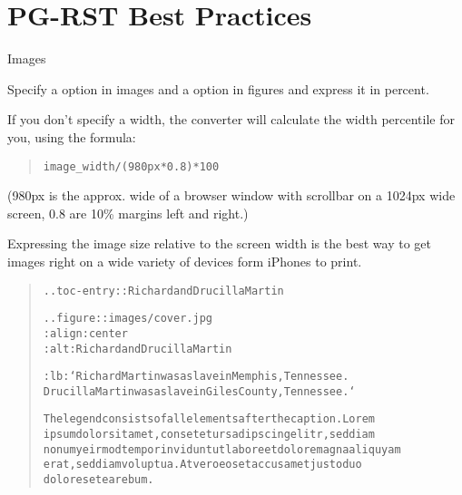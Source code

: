 \documentclass[a5paper]{book}
\begin{document}
\begin{german}
\cleardoublepage
\label{pg-rst-best-practices}%
\hypertarget{pg-rst-best-practices}{}%
%
\chapter*{PG-RST Best Practices}


\vspace{1em}
\begin{center}
Images
\end{center}

\vspace{2em}
Specify a {} option in images and a {}
option in figures and express it in percent.\par

If you don’t specify a width, the converter will calculate the width
percentile for you, using the formula:\par

\begin{quote}
\begin{alltt}
image\_width / (980px * 0.8) * 100
\end{alltt}
\end{quote}

(980px is the approx. wide of a browser window with scrollbar on a
1024px wide screen, 0.8 are 10\% margins left and right.)\par

Expressing the image size relative to the screen width is the best way
to get images right on a wide variety of devices form iPhones to
print.\par

\begin{quote}
\begin{alltt}
.. toc-entry:: Richard and Drucilla Martin

.. figure:: images/cover.jpg
   :align: center
   :alt: Richard and Drucilla Martin

   :lb:`Richard Martin was a slave in Memphis, Tennessee.
   Drucilla Martin was a slave in Giles County, Tennessee.`

   The legend consists of all elements after the caption.  Lorem
   ipsum dolor sit amet, consetetur sadipscing elitr, sed diam
   nonumy eirmod tempor invidunt ut labore et dolore magna aliquyam
   erat, sed diam voluptua. At vero eos et accusam et justo duo
   dolores et ea rebum.
\end{alltt}
\end{quote}


\end{german}
\end{document}
